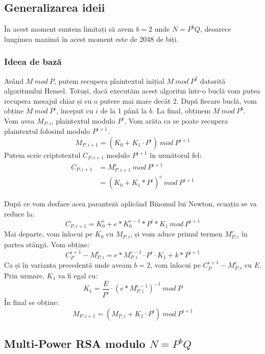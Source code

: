 \documentclass[12]{report}
\begin{document}
		  \subsection{Generalizarea ideii}
		  În acest moment suntem limitați să avem $b=2$ unde $N=P^bQ$, deoarece lungimea maximă în acest moment este de 2048 de biți.
		  \subsubsection{Ideea de bază}
		  Având $M \ mod \ P$, putem recupera plaintextul inițial $ M \ mod \ P^2$ datorită algoritmului Hensel. Totuși, dacă executăm acest algoritm într-o buclă vom putea recupera mesajul chiar și cu o putere mai mare decât 2. După fiecare buclă, vom obține $ M  \ mod \ P^i$, început cu $i$ de la 1 până la $b$. La final, obținem $M \ mod \ P^b$. Vom avea $M_{P,i}$, plaintextul modulo $P^i$. Vom arăta ca se poate recupera plaintextul folosind modulo $P^{i+1}.$
		  $$M_{P,i+1} = (K_0 +K_1 \cdot   P^i) \ mod \ P^{i+1}$$
		  Putem scrie criptotextul $C_{P,i+1}$ modulo $P^{i+1}$ în următorul fel:
		  \begin{align*}
		  C_{P,i+1} &= M_{P,i+1}^{e} \ mod \ P^{i+1}\\
		   &= (K_0+K_1*P^i)^e \ mod \ P^{i+1} 
		  \end{align*}
		  
		  După ce vom desface acea paranteză aplicând Binomul lui Newton, ecuația se va reduce la:
		  $$ C_{P,i+1} = K_{0}^{e} + e*K_{0}^{e-1} *P^i*K_1 \ mod \ P^{i+1}$$
		  Mai departe, vom înlocui pe $K_0$ cu $M_{P,i}$, și vom aduce primul termen $M_{P,i}^{e}$ în partea stângă. Vom obține:
		  $$C_{P}^{i+1} - M_{P,i}^{e} = e*M_{P,i}^{e-1} \cdot   P^i \cdot   K_1 + k *P^{i+1}$$
		  Ca și în varianta precedentă unde aveam $b=2$, vom înlocui pe $C_{P}^{i+1} - M_{P,i}^{e}$ cu $E$. Prin urmare, $K_1$ va fi egal cu:
		  $$K_1 = \frac{E}{P^i} \cdot   (e*M_{P,i}^{e-1})^{-1} \ mod \ P$$
		  În final se obține:
		  $$M_{P,i+1}= (M_{P,i} + K_1 \cdot   P^i) \ mod \ P^{i+1}$$
		  \subsection{Multi-Power RSA modulo $N=P^bQ$}
\end{document}
